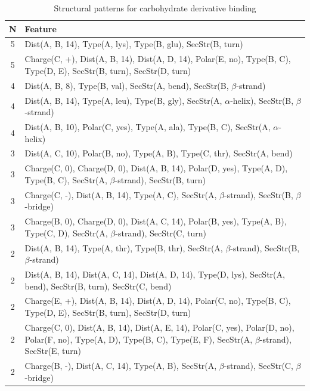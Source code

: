 \documentclass[11pt,twoside,a4paper]{book}
\begin{document}
\begin{table}\begin{tabularx}{\textwidth}{cX}\textbf{N} & \textbf{Feature} \\ \hline  
5 & Dist(A, B, 14),  Type(A, lys), Type(B, glu), SecStr(B, turn)\\ \hline 
5 & Charge(C, +), Dist(A, B, 14), Dist(A, D, 14), Polar(E, no),  Type(B, C), \newline Type(D, E), SecStr(B, turn), SecStr(D, turn)\\ \hline 
4 & Dist(A, B, 8),  Type(B, val), SecStr(A, bend), SecStr(B, $\beta$-strand)\\ \hline 
4 & Dist(A, B, 14),  Type(A, leu), Type(B, gly), SecStr(A, $\alpha$-helix), SecStr(B, $\beta$-strand)\\ \hline 
4 & Dist(A, B, 10), Polar(C, yes),  Type(A, ala), Type(B, C), SecStr(A, $\alpha$-helix)\\ \hline 
3 & Dist(A, C, 10), Polar(B, no),  Type(A, B), Type(C, thr), SecStr(A, bend)\\ \hline 
3 & Charge(C, 0), Charge(D, 0), Dist(A, B, 14), Polar(D, yes),  Type(A, D), Type(B, C), SecStr(A, $\beta$-strand), SecStr(B, turn)\\ \hline 
3 & Charge(C, -), Dist(A, B, 14),  Type(A, C), SecStr(A, $\beta$-strand), SecStr(B, $\beta$-bridge)\\ \hline 
3 & Charge(B, 0), Charge(D, 0), Dist(A, C, 14), Polar(B, yes),  Type(A, B), Type(C, D), SecStr(A, $\beta$-strand), SecStr(C, turn)\\ \hline 
2 & Dist(A, B, 14),  Type(A, thr), Type(B, thr), SecStr(A, $\beta$-strand), SecStr(B, $\beta$-strand)\\ \hline 
2 & Dist(A, B, 14), Dist(A, C, 14), Dist(A, D, 14),  Type(D, lys), SecStr(A, bend),  \newline SecStr(B, turn), SecStr(C, bend)\\ \hline 
2 & Charge(E, +), Dist(A, B, 14), Dist(A, D, 14), Polar(C, no),  Type(B, C),  \newline Type(D, E), SecStr(B, turn), SecStr(D, turn)\\ \hline 
2 & Charge(C, 0), Dist(A, B, 14), Dist(A, E, 14), Polar(C, yes), Polar(D, no), \newline Polar(F, no),  Type(A, D), Type(B, C), Type(E, F), SecStr(A, $\beta$-strand), SecStr(E, turn)\\ \hline 
2 & Charge(B, -), Dist(A, C, 14),  Type(A, B), SecStr(A, $\beta$-strand), SecStr(C, $\beta$-bridge)\\ \hline 
 \end{tabularx}\caption{Structural patterns for carbohydrate derivative binding}\label{tab:carbohydrate_derivative_binding}\end{table}
\end{document}

